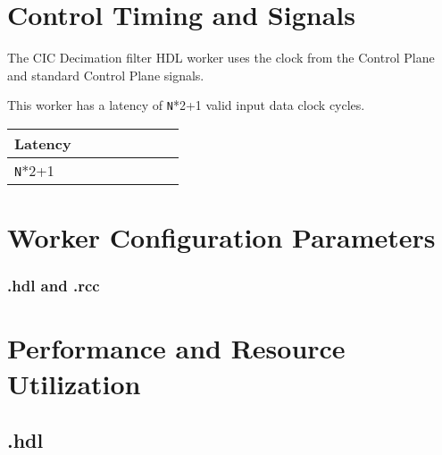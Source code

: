 \section*{Control Timing and Signals}
\begin{flushleft}
	The CIC Decimation filter HDL worker uses the clock from the Control Plane and standard Control Plane signals.\medskip


	This worker has a latency of \verb+N+*2+1 valid input data clock cycles.\medskip

	\begin{tabular}{|M{4.5cm}|M{4.5cm}|M{1cm}|M{1.5cm}|M{2cm}|M{1cm}|M{1cm}|M{2.5cm}|}
		\hline
		\hline
		Latency         \\
		\hline
		\verb+N+*2+1    \\
		\hline
	\end{tabular}
\end{flushleft}

\begin{landscape}
\section*{Worker Configuration Parameters}
\subsubsection*{\comp.hdl and \comp.rcc}
%
\section*{Performance and Resource Utilization}
\subsection*{\comp.hdl}
%
\end{landscape}
\newpage





